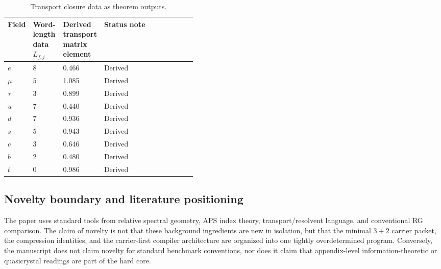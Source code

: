 \begin{table}[H]
\centering
\scriptsize
\begin{tabularx}{\linewidth}{@{}>{\raggedright\arraybackslash}p{0.11\linewidth}>{\centering\arraybackslash}p{0.16\linewidth}>{\raggedleft\arraybackslash}p{0.16\linewidth}Y@{}}
\toprule
Field & Word-length data $L_{f,j}$ & Derived transport matrix element & Status note \\
\midrule
$e$ & $8$ & \num{0.466} & Derived \\
$\mu$ & $5$ & \num{1.085} & Derived \\
$\tau$ & $3$ & \num{0.899} & Derived \\
$u$ & $7$ & \num{0.440} & Derived \\
$d$ & $7$ & \num{0.936} & Derived \\
$s$ & $5$ & \num{0.943} & Derived \\
$c$ & $3$ & \num{0.646} & Derived \\
$b$ & $2$ & \num{0.480} & Derived \\
$t$ & $0$ & \num{0.986} & Derived \\
\bottomrule
\end{tabularx}
\caption{Transport closure data as theorem outputs.}
\label{tab:yukawa-residuals}
\end{table}

\subsection{Novelty boundary and literature positioning}

The paper uses standard tools from relative spectral geometry, APS index theory, transport/resolvent language, and conventional RG comparison. The claim of novelty is not that these background ingredients are new in isolation, but that the minimal $3+2$ carrier packet, the compression identities, and the carrier-first compiler architecture are organized into one tightly overdetermined program. Conversely, the manuscript does not claim novelty for standard benchmark conventions, nor does it claim that appendix-level information-theoretic or quasicrystal readings are part of the hard core.

